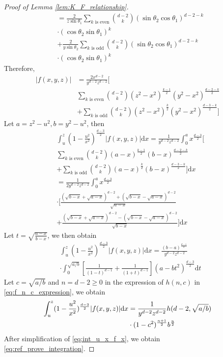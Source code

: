 \documentclass[conference,a4paper]{IEEEtran}
\def\d{\mathrm{d}}
\begin{document}
\begin{proof}[Proof of Lemma \ref{lem:K_F_relationship}]
\begin{align*}
&=\frac{2}{z\sin\theta_1}\sum_{k \textrm{ is even}}
\binom{d-2}{k} (\sin\theta_2\cos\theta_1)^{d-2-k}\\
&\cdot(\cos\theta_2 \sin\theta_1)^k \\
&+\frac{2}{y\sin\theta_2} \sum_{k \textrm{ is odd}}
\binom{d-2}{k} (\sin\theta_2\cos\theta_1)^{d-2-k}\\
&\cdot(\cos\theta_2 \sin\theta_1)^k
\end{align*}
Therefore,
\begin{align*}
|f(x,y,z)|
&= \frac{2x^{d-2}}{y^{d-2}z^{d-2}}
\Big[
     \\
    &\sum_{k \textrm{ is even}}
    \binom{d-2}{k} (z^2-x^2)^{\frac{k-1}{2}}(y^2-x^2)^{\frac{d-2-k}{2}}\\
    &+ \sum_{k \textrm{ is odd}}
    \binom{d-2}{k}    (z^2-x^2)^{\frac{k}{2}}
    (y^2-x^2)^{\frac{d-3-k}{2}}
\Big]
\end{align*}
Let $a=z^2-u^2, b=y^2-u^2$, then
\begin{align*}
     &\int_u^z (1-\frac{u^2}{x^2})^{\frac{d-3}{2}}
     |f(x,y,z)|\d x
     =\frac{1}{y^{d-2}z^{d-2}}
     \int_0^a x^{\frac{d-3}{2}}\Big[ \\
     &\sum_{k \textrm{ is even}}
     \binom{d-2}{k} (a-x)^{\frac{k-1}{2}}
     (b-x)^{\frac{d-2-k}{2}}\\
     &+ \sum_{k \textrm{ is odd}}
     \binom{d-2}{k} (a-x)^{\frac{k}{2}}
     (b-x)^{\frac{d-3-k}{2}}
     \Big]\d x\\
     &=\frac{1}{2y^{d-2}z^{d-2}}
     \int_0^a x^{\frac{d-3}{2}}\\
     &\cdot\Big[\frac{(\sqrt{b-x} + \sqrt{a-x})^{d-2}+(\sqrt{b-x} - \sqrt{a-x})^{d-2}}{\sqrt{a-x}}\\
     &+\frac{(\sqrt{b-x} + \sqrt{a-x})^{d-2}-(\sqrt{b-x} - \sqrt{a-x})^{d-2}}{\sqrt{b-x}}\Big] \d x
\end{align*}
Let $t=\sqrt{\frac{a-x}{b-x}}$, we then obtain
\begin{align*}
     &\int_u^z (1-\frac{u^2}{x^2})^{\frac{d-3}{2}}
     |f(x,y,z)|\d x= \frac{(b-a)^{\frac{d-1}{2}}}{y^{d-2}z^{d-2}}\\
     &\cdot\int_0^{\sqrt{a/b}}
     \left[\frac{1}{(1-t)^{d-1}}+\frac{1}{(1+t)^{d-1}}\right](a-bt^2)^{\frac{d-3}{2}}\d t
\end{align*}
Let $c=\sqrt{a/b}$ and $n=d-2\geq 0$ in the expression of $h(n,c)$ in \eqref{eq:f_n_c_expression},
we obtain
\begin{align}
     \int_u^z (1-\frac{u^2}{x^2})^{\frac{d-3}{2}}
     |f(x,y,z)|\d x
     &= \frac{1}{y^{d-2}z^{d-2}}h(d-2, \sqrt{a/b}) \notag\\
     &\cdot(1-c^2)^{\frac{n+1}{2}}b^{\frac{n}{2}}\label{eq:int_u_x_f_x}
\end{align}
After simplification of \eqref{eq:int_u_x_f_x}, we obtain \eqref{eq:ref_prove_integration}.
\end{proof}
\end{document}
